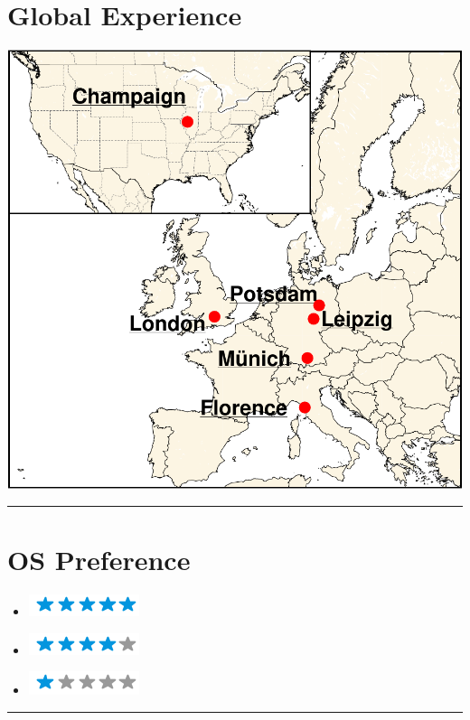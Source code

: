 \documentclass{article}
\begin{document}
\begin{minipage}[t]{0.28\textwidth}
	\centering
	\section*{\hfill \fontsize{18pt}{24pt}\selectfont \color{pblue} Global Experience}
	\vspace{-2mm}
	\includegraphics[scale=0.3]{../img/globalEXPENG.pdf}
	\vspace{2mm}
	\hrule
	\vspace{-3mm}
	\section*{\fontsize{18pt}{24pt}\selectfont \color{pblue} OS Preference}
	\vspace{-2mm}
	\begin{itemize}
	\centering
	\item[\textbf{\LARGE \faLinux}]\includegraphics[scale=0.50]{../img/5stars.png}\vspace{-2mm}
	\item[\textbf{\LARGE \faWindows}]\includegraphics[scale=0.50]{../img/4stars.png}\vspace{-2mm}
    \item[\textbf{\LARGE \faApple}]\includegraphics[scale=0.50]{../img/1stars.png}
    \end{itemize}
	\hrule
	\vspace{-2mm}

\end{minipage}
\end{document}
